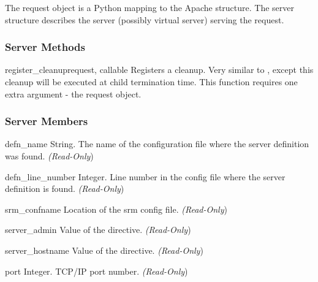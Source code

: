 The request object is a Python mapping to the Apache 
structure. The server structure describes the server (possibly virtual
server) serving the request.

\subsubsection{Server Methods\label{pyapi-mpsrv-meth}}

\begin{methoddesc}[server]{register_cleanup}{request, callable}
Registers a cleanup. Very similar to , except
this cleanup will be executed at child termination time. This function
requires one extra argument - the request object.
\end{methoddesc}

\subsubsection{Server Members\label{pyapi-mpsrv-mem}}

\begin{memberdesc}[server]{defn_name}
String. The name of the configuration file where the server definition
was found.
\emph{(Read-Only})
\end{memberdesc}

\begin{memberdesc}[server]{defn_line_number}
Integer. Line number in the config file where the server definition is
found.
\emph{(Read-Only})
\end{memberdesc}

\begin{memberdesc}[server]{srm_confname}
Location of the srm config file.
\emph{(Read-Only})
\end{memberdesc}

\begin{memberdesc}[server]{server_admin}
Value of the  directive. 
\emph{(Read-Only})
\end{memberdesc}

\begin{memberdesc}[server]{server_hostname}
Value of the  directive.
\emph{(Read-Only})
\end{memberdesc}

\begin{memberdesc}[server]{port}
Integer. TCP/IP port number.
\emph{(Read-Only})
\end{memberdesc}

